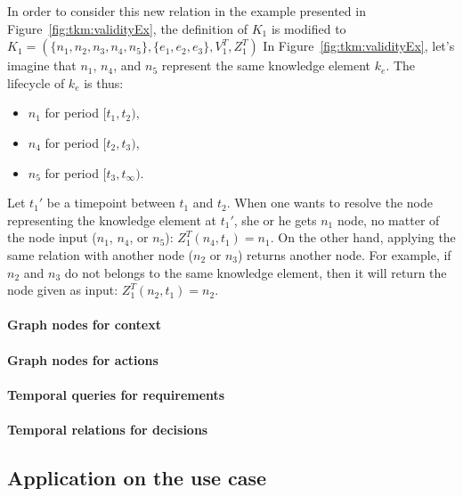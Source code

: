 In order to consider this new relation in the example presented in Figure~\ref{fig:tkm:validityEx}, the definition of $K_1$ is modified to $K_1 = (\{n_1, n_2, n_3, n_4, n_5\}, \{e_1, e_2, e_3\}, V^{T}_1, Z^{T}_1)$
In Figure~\ref{fig:tkm:validityEx}, let's imagine that $n_1$, $n_4$, and $n_5$ represent the same knowledge element $k_e$.
The lifecycle of $k_e$ is thus:
\begin{itemize}
	\vspace{-0.5em}
	\setlength\itemsep{-0.3em}
	\item $n_1$ for period $[t_1, t_2)$,
	\item $n_4$ for period $[t_2, t_3)$,
	\item $n_5$ for period $[t_3, t_\infty)$.
\end{itemize}
Let $t_1'$ be a timepoint between $t_1$ and $t_2$.
When one wants to resolve the node representing the knowledge element at $t_1'$, she or he gets $n_1$ node, no matter of the node input ($n_1$, $n_4$, or $n_5$): $Z^{T}_1(n_4, t_1) = n_1$.
On the other hand, applying the same relation with another node ($n_2$ or $n_3$) returns another node.
For example, if $n_2$ and $n_3$ do not belongs to the same knowledge element, then it will return the node given as input: $Z^{T}_1(n_2, t_1) = n_2$.

\paragraph{Graph nodes for context}
\paragraph{Graph nodes for actions}

\paragraph{Temporal queries for requirements}
\paragraph{Temporal relations for decisions}






















\subsection{Application on the use case}







